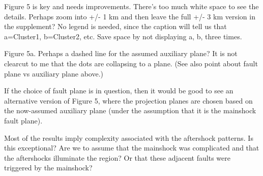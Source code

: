 \documentclass[10pt]{extarticle}
\begin{document}
\begin{ReviewerComment}{1}
\noindent 
Figure 5 is key and needs improvements. There's too much white space to see the details.  Perhaps zoom into +/- 1 km and then leave the full +/- 3 km version in the supplement? No legend is needed, since the caption will tell us that a=Cluster1, b=Cluster2, etc. Save space by not displaying a, b, three times.

\end{ReviewerComment}


\begin{Answer}
 \WorkInProgressRevTask
\end{Answer}
%
%


\begin{ReviewerComment}{1}
\noindent 
Figure 5a. Perhaps a dashed line for the assumed auxiliary plane? It is not clearcut to me that the dots are collapsing to a plane. (See also point about fault plane vs auxiliary plane above.)

\end{ReviewerComment}


\begin{Answer}
 \WorkInProgressRevTask
\end{Answer}
%
%


\begin{ReviewerComment}{1}
\noindent 
If the choice of fault plane is in question, then it would be good to see an alternative version of Figure 5, where the projection planes are chosen based on the now-assumed auxiliary plane (under the assumption that it is the mainshock fault plane).

\end{ReviewerComment}


\begin{Answer}
 \WorkInProgressRevTask
\end{Answer}
%
%


\begin{ReviewerComment}{1}
\noindent 
Most of the results imply complexity associated with the aftershock patterns. Is this exceptional? Are we to assume that the mainshock was complicated and that the aftershocks illuminate the region? Or that these adjacent faults were triggered by the mainshock?

\end{ReviewerComment}


\begin{Answer}
 \WorkInProgressRevTask
\end{Answer}
%
%
\end{document}

